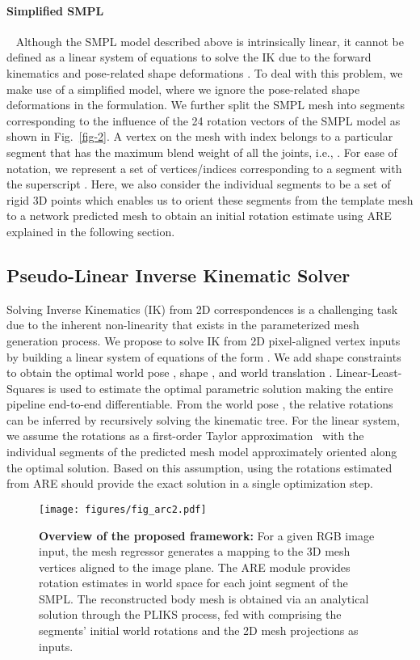 \documentclass[10pt,twocolumn,letterpaper]{article}
\begin{document}
\paragraph{Simplified SMPL}~\label{sec:ssmpl}
Although the SMPL model described above
is intrinsically linear, it cannot be defined as a linear system of equations to solve the IK due to the forward kinematics and pose-related shape deformations . To deal with this problem, we make use of a simplified model, where we ignore the pose-related shape deformations  in the formulation. We further split the SMPL mesh into  segments  corresponding to the influence of the 24 rotation vectors  of the SMPL model as shown in Fig.~\ref{fig-2}. A vertex on the mesh with index  belongs to a particular segment that has the maximum blend weight of all the joints, i.e., . 
For ease of notation, we represent a set of vertices/indices corresponding to a segment  with the superscript .
Here, we also consider the individual segments to be a set of rigid 3D points which enables us to orient these segments from the template mesh   to a network predicted mesh  to obtain an initial rotation estimate using ARE explained in the following section.



\subsection{Pseudo-Linear Inverse Kinematic Solver}\label{meth-sec-002}
Solving Inverse Kinematics (IK) from 2D correspondences is a challenging task due to the inherent non-linearity that exists in the parameterized mesh generation process. We propose to solve IK from 2D pixel-aligned vertex inputs by building a linear system of equations of the form . We add shape constraints to obtain the optimal world pose , shape , and world translation . Linear-Least-Squares is used to estimate the optimal parametric solution making the entire pipeline end-to-end differentiable. From the world pose , the relative rotations  can be inferred by recursively solving the kinematic tree. For the linear system, we assume the rotations as a first-order Taylor approximation~\cite{taylor} with the individual segments of the predicted mesh model approximately oriented  along the optimal solution. Based on this assumption, using the rotations estimated from ARE should provide the exact solution in a single optimization step.

\begin{figure*}
\begin{center}
\centering
\texttt{[image: figures/fig\_arc2.pdf]}
\end{center}
  \caption{\textbf{Overview of the proposed framework:}  For a given RGB image input, the mesh regressor generates a mapping to the 3D mesh vertices aligned to the image plane. The ARE module provides rotation estimates in world space for each joint segment of the SMPL. The reconstructed body mesh is obtained via an analytical solution through the PLIKS process, fed with  comprising the segments' initial world rotations and the 2D mesh projections  as inputs.}
\label{fig-arc}
\end{figure*}
\end{document}

